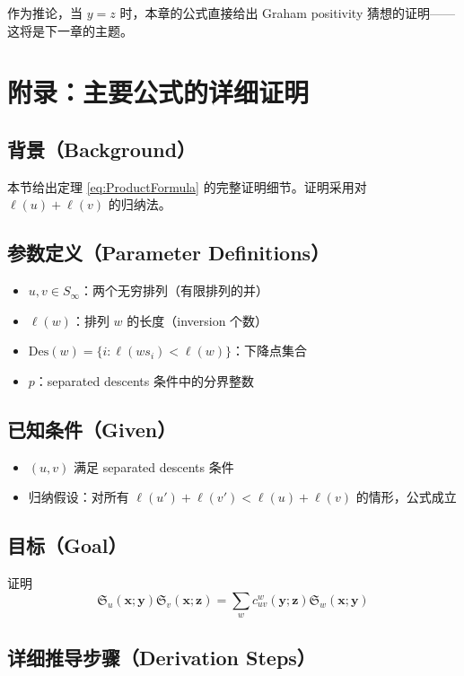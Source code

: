 作为推论，当 $y = z$ 时，本章的公式直接给出 Graham positivity 猜想的证明——这将是下一章的主题。

\section{附录：主要公式的详细证明}
\label{sec:appendix-ch2-proof}

\subsection{背景（Background）}
本节给出定理 \cref{eq:ProductFormula} 的完整证明细节。证明采用对 $\ell(u) + \ell(v)$ 的归纳法。

\subsection{参数定义（Parameter Definitions）}
\begin{itemize}
\item $u, v \in S_\infty$：两个无穷排列（有限排列的并）
\item $\ell(w)$：排列 $w$ 的长度（inversion 个数）
\item $\mathrm{Des}(w) = \{i : \ell(ws_i) < \ell(w)\}$：下降点集合
\item $p$：separated descents 条件中的分界整数
\end{itemize}

\subsection{已知条件（Given）}
\begin{itemize}
\item $(u, v)$ 满足 separated descents 条件
\item 归纳假设：对所有 $\ell(u') + \ell(v') < \ell(u) + \ell(v)$ 的情形，公式成立
\end{itemize}

\subsection{目标（Goal）}
证明
$$\mathfrak{S}_u(\mathbf{x}; \mathbf{y}) \mathfrak{S}_v(\mathbf{x}; \mathbf{z}) = \sum_{w} c_{uv}^w(\mathbf{y}; \mathbf{z}) \mathfrak{S}_w(\mathbf{x}; \mathbf{y})$$

\subsection{详细推导步骤（Derivation Steps）}

